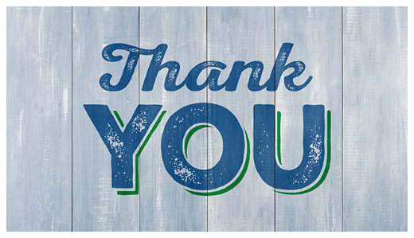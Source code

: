 \documentclass{beamer}
\begin{document}
\begin{frame}
\centering
\includegraphics[width=1.0\textwidth]{Thank.png}
\end {frame}
\end{document}
